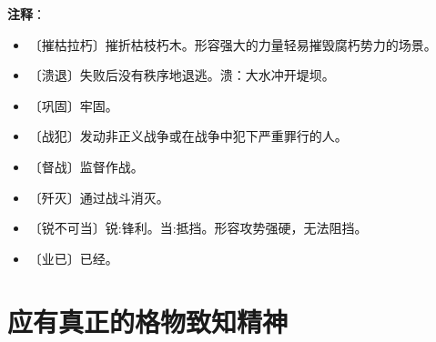 \documentclass[12pt,UTF-8,openany]{ctexbook}
\begin{document}
\newpage

\textbf{注释}：

\vspace{-1em}

\begin{itemize}
    \setlength\itemsep{-0.2em}
    \item 〔摧枯拉朽〕摧折枯枝朽木。形容强大的力量轻易摧毁腐朽势力的场景。
    \item 〔溃退〕失败后没有秩序地退逃。溃：大水冲开堤坝。
    \item 〔巩固〕牢固。
    \item 〔战犯〕发动非正义战争或在战争中犯下严重罪行的人。
    \item 〔督战〕监督作战。
    \item 〔歼灭〕通过战斗消灭。
    \item 〔锐不可当〕锐:锋利。当:抵挡。形容攻势强硬，无法阻挡。
    \item 〔业已〕已经。
\end{itemize}

\chapter{应有真正的格物致知精神}
\end{document}
